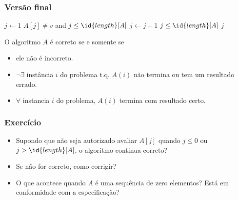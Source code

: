 \documentclass{beamer}
\begin{document}
\begin{frame}

\frametitle{Versão final}

\begin{codebox}
\li $j \gets 1$
\li \While $A[j] \neq v$ and $j \le \id{length}[A]$
\li \Do
      $j \gets j+1$
    \End
\li \If $j \le \id{length}[A]$
\li \Then
      \Return $j$
\li \Else
      \Return {}
    \End
\end{codebox}  

\pause

O algoritmo $A$ é correto se e somente se 
\begin{itemize}
\item ele não é incorreto. \pause
\item $\neg \exists$ instância $i$ do problema t.q. $A(i)$ não termina ou tem um resultado errado. \pause
\item $\forall$ instancia $i$ do problema, $A(i)$ termina com resultado certo.
\end{itemize}

\end{frame}

\begin{frame}

\frametitle{Exercício}

\begin{itemize}

  \item Supondo que não seja autorizado avaliar $A[j]$ quando $j \le
    0$ ou $j > \id{length}[A]$, o algoritmo continua correto?

  \item Se não for correto, como corrigir?

  \item O que acontece quando $A$ é uma sequência de zero elementos? Está em
conformidade com a especificação?

\end{itemize}

\end{frame}
\end{document}
